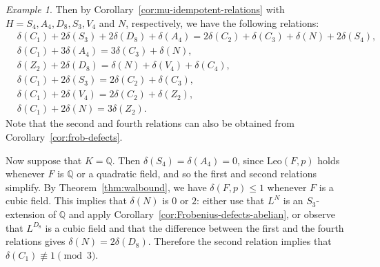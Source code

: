 \documentclass[12pt]{amsart}
\theoremstyle{plain}
\theoremstyle{remark}
\newtheorem{example}[theorem]{Example}
\theoremstyle{definition}
\newcommand{\Q}{\mathbb{Q}}
\newcommand{\Leo}{\mathrm{Leo}}
\numberwithin{equation}{section}
\begin{document}
\begin{example}
Then by Corollary~\ref{cor:mu-idempotent-relations} with $H=S_{4}, A_{4}, D_{8}, S_{3}, V_{4}$ and $N$, respectively, we have the following relations:
\begin{align*}
 &\delta(C_{1})+2\delta(S_{3})+2\delta(D_{8}) + \delta(A_{4}) 
 = 2\delta(C_{2})+\delta(C_{3})+\delta(N) + 2\delta(S_{4}),\\
 &\delta(C_{1}) + 3\delta(A_{4}) = 3\delta(C_{3})+\delta(N),\\
 &\delta(Z_{2})+2\delta(D_{8})=\delta(N)+\delta(V_{4})+\delta(C_{4}),\\
 &\delta(C_{1})+2\delta(S_{3})=2\delta(C_{2})+\delta(C_{3}),\\
 &\delta(C_{1})+2\delta(V_{4})=2\delta(C_{2})+\delta(Z_{2}),\\
 &\delta(C_{1})+2\delta(N)=3\delta(Z_{2}).
\end{align*}
Note that the second and fourth relations can also be obtained from Corollary~\ref{cor:frob-defects}.

Now suppose that $K=\Q$. 
Then $\delta(S_{4})=\delta(A_{4})=0$, since $\Leo(F,p)$ holds whenever $F$ is $\Q$ or a quadratic field, 
and so the first and second relations simplify. 
By Theorem~\ref{thm:walbound}, we have $\delta(F,p) \leq 1$ whenever $F$ is a cubic field. 
This implies that $\delta(N)$ is $0$ or $2$: either use that 
$L^{N}$ is an $S_{3}$-extension of $\Q$ and apply  
Corollary~\ref{cor:Frobenius-defects-abelian}, or
observe that $L^{D_{8}}$ is a cubic field and that
the difference between the first and the fourth relations gives $\delta(N)=2\delta(D_{8})$.
Therefore the second relation implies that $\delta(C_{1}) \not \equiv 1 \pmod 3$.


\end{example}
\end{document}

